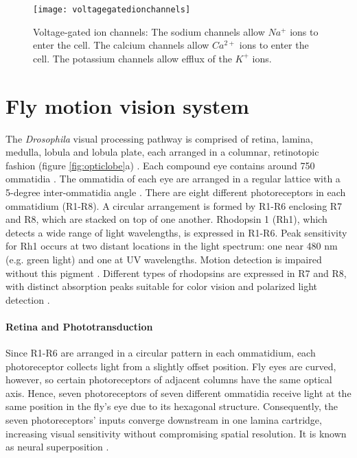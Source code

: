 \begin{figure}
\centering
\hspace*{-1cm} 
\texttt{[image: voltagegatedionchannels]}
\caption[Voltage-gated ion channels] {Voltage-gated ion channels: The sodium channels allow $Na^{+}$ ions to enter the cell. The calcium channels allow $Ca^{2+}$ ions to enter the cell. The potassium channels allow efflux of the $K^{+}$ ions.}
\label{fig:vgatedionc}
\end{figure}


\section{Fly motion vision system}
The \textit{Drosophila} visual processing pathway is comprised of retina, lamina, medulla, lobula and lobula plate, each arranged in a columnar, retinotopic fashion (figure \ref{fig:opticlobe}a) \parencite{Fischbach1989}. Each compound eye contains around 750 ommatidia \parencite{Ready1976}. The ommatidia of each eye are arranged in a regular lattice with a 5-degree inter-ommatidia angle \parencite{Land1997}. There are eight different photoreceptors in each ommatidium (R1-R8). A circular arrangement is formed by R1-R6 enclosing R7 and R8, which are stacked on top of one another. Rhodopsin 1 (Rh1), which detects a wide range of light wavelengths, is expressed in R1-R6. Peak sensitivity for Rh1 occurs at two distant locations in the light spectrum: one near 480 nm (e.g. green light) and one at UV wavelengths. Motion detection is impaired without this pigment \parencite{Rister2007}. Different types of rhodopsins are expressed in R7 and R8, with distinct absorption peaks suitable for color vision and polarized light detection \parencite{Yamaguchi2008, Wernet2004}.

\paragraph{Retina and Phototransduction}
Since R1-R6 are arranged in a circular pattern in each ommatidium, each photoreceptor collects light from a slightly offset position. Fly eyes are curved, however, so certain photoreceptors of adjacent columns have the same optical axis. Hence, seven photoreceptors of seven different ommatidia receive light at the same position in the fly's eye due to its hexagonal structure. Consequently, the seven photoreceptors' inputs converge downstream in one lamina cartridge, increasing visual sensitivity without compromising spatial resolution. It is known as neural superposition \parencite{Kirschfeld1967}.

